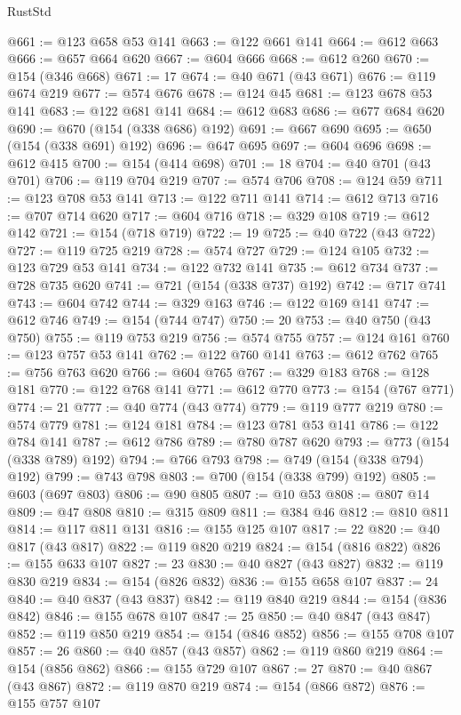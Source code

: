 \begin{lexlean}{RustStd}
\begin{coremodule}
{\begin{coremodule}
{{{{{{{{{{{{{{{{{{{{{{{{{{{{{{{{{{{{{{{{{{{{{{{@661 := @123 @658 @53 @141
@663 := @122 @661 @141
@664 := @612 @663
@666 := @657 @664 @620
@667 := @604 @666
@668 := @612 @260
@670 := @154 (@346 @668)
@671 := 17
@674 := @40 @671 (@43 @671)
@676 := @119 @674 @219
@677 := @574 @676
@678 := @124 @45
@681 := @123 @678 @53 @141
@683 := @122 @681 @141
@684 := @612 @683
@686 := @677 @684 @620
@690 := @670 (@154 (@338 @686) @192)
@691 := @667 @690
@695 := @650 (@154 (@338 @691) @192)
@696 := @647 @695
@697 := @604 @696
@698 := @612 @415
@700 := @154 (@414 @698)
@701 := 18
@704 := @40 @701 (@43 @701)
@706 := @119 @704 @219
@707 := @574 @706
@708 := @124 @59
@711 := @123 @708 @53 @141
@713 := @122 @711 @141
@714 := @612 @713
@716 := @707 @714 @620
@717 := @604 @716
@718 := @329 @108
@719 := @612 @142
@721 := @154 (@718 @719)
@722 := 19
@725 := @40 @722 (@43 @722)
@727 := @119 @725 @219
@728 := @574 @727
@729 := @124 @105
@732 := @123 @729 @53 @141
@734 := @122 @732 @141
@735 := @612 @734
@737 := @728 @735 @620
@741 := @721 (@154 (@338 @737) @192)
@742 := @717 @741
@743 := @604 @742
@744 := @329 @163
@746 := @122 @169 @141
@747 := @612 @746
@749 := @154 (@744 @747)
@750 := 20
@753 := @40 @750 (@43 @750)
@755 := @119 @753 @219
@756 := @574 @755
@757 := @124 @161
@760 := @123 @757 @53 @141
@762 := @122 @760 @141
@763 := @612 @762
@765 := @756 @763 @620
@766 := @604 @765
@767 := @329 @183
@768 := @128 @181
@770 := @122 @768 @141
@771 := @612 @770
@773 := @154 (@767 @771)
@774 := 21
@777 := @40 @774 (@43 @774)
@779 := @119 @777 @219
@780 := @574 @779
@781 := @124 @181
@784 := @123 @781 @53 @141
@786 := @122 @784 @141
@787 := @612 @786
@789 := @780 @787 @620
@793 := @773 (@154 (@338 @789) @192)
@794 := @766 @793
@798 := @749 (@154 (@338 @794) @192)
@799 := @743 @798
@803 := @700 (@154 (@338 @799) @192)
@805 := @603 (@697 @803)
@806 := @90 @805
@807 := @10 @53
@808 := @807 @14
@809 := @47 @808
@810 := @315 @809
@811 := @384 @46
@812 := @810 @811
@814 := @117 @811 @131
@816 := @155 @125 @107
@817 := 22
@820 := @40 @817 (@43 @817)
@822 := @119 @820 @219
@824 := @154 (@816 @822)
@826 := @155 @633 @107
@827 := 23
@830 := @40 @827 (@43 @827)
@832 := @119 @830 @219
@834 := @154 (@826 @832)
@836 := @155 @658 @107
@837 := 24
@840 := @40 @837 (@43 @837)
@842 := @119 @840 @219
@844 := @154 (@836 @842)
@846 := @155 @678 @107
@847 := 25
@850 := @40 @847 (@43 @847)
@852 := @119 @850 @219
@854 := @154 (@846 @852)
@856 := @155 @708 @107
@857 := 26
@860 := @40 @857 (@43 @857)
@862 := @119 @860 @219
@864 := @154 (@856 @862)
@866 := @155 @729 @107
@867 := 27
@870 := @40 @867 (@43 @867)
@872 := @119 @870 @219
@874 := @154 (@866 @872)
@876 := @155 @757 @107
}}}}}}}}}}}}}}}}}}}}}}}}}}}}}}}}}}}}}}}}}}}}}}}
\end{coremodule}}
\end{coremodule}
\end{lexlean}
